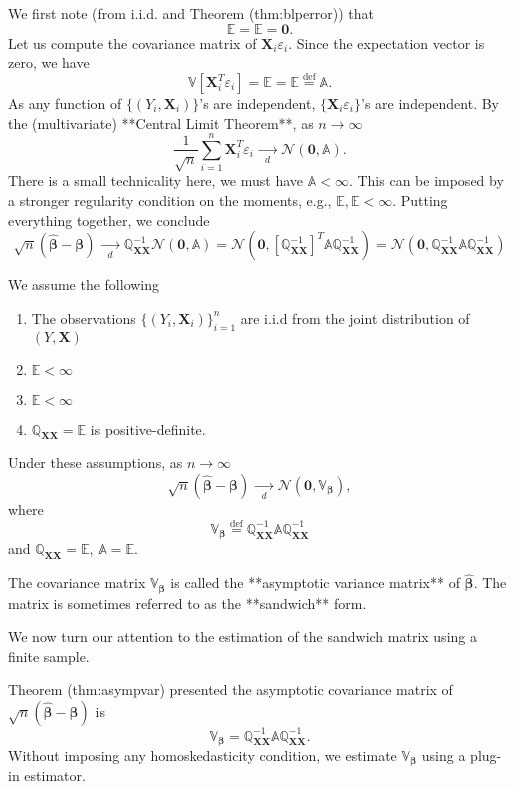 \documentclass[12pt, block=fill]{beamer}
\newcommand{\E}[1]{\mathbb{E}}
\renewcommand{\v}[1]{\boldsymbol{#1}}
\newcommand{\m}[1]{\mathbb{#1}}
\newcommand{\eps}{\varepsilon}
\begin{document}
We first note (from i.i.d. and Theorem \@ref(thm:blperror)) that 
$$
\E{\v{X}_i^T\eps_i}=\E{\v{X}^T\eps}=\v{0}.
$$
Let us compute the covariance matrix of $\v{X}_i\eps_i$. Since the expectation vector is zero, we have 
$$
\m{V}[\v{X}_i^T\eps_i]=\E{\v{X}_i^T\eps_i\left(\v{X}_i^T\eps_i\right)^T}=\E{\v{X}^T\v{X}\eps^2}\stackrel{\text{def}}{=}\m{A}.
$$
As any function of $\{(Y_i,\v{X}_i)\}$'s are independent,  $\{\v{X}_i\eps_i\}$'s are independent. By the (multivariate) **Central Limit Theorem**, as $n\to\infty$
$$
\frac{1}{\sqrt{n}}\sum\limits_{i=1}^n\v{X}_i^T\eps_i
\xrightarrow[d]{\quad\quad}\mathcal{N}(\v{0},\m{A}).
$$
There is a small technicality here, we must have $\m{A}<\infty$. This can be imposed by a stronger regularity condition on the moments, e.g.,
$\E{Y^4},\E{||\v{X}||^4}<\infty$.
Putting everything together, we conclude
$$
\sqrt{n}(\widehat{\v{\beta}}-\v{\beta})\xrightarrow[d]{\quad\quad}
\m{Q}_{\v{XX}}^{-1}\mathcal{N}(\v{0},\m{A})
=\mathcal{N}\left(\v{0},\left[\m{Q}_{\v{XX}}^{-1}\right]^T\m{A}\m{Q}_{\v{XX}}^{-1}\right)
=\mathcal{N}\left(\v{0},\m{Q}_{\v{XX}}^{-1}\m{A}\m{Q}_{\v{XX}}^{-1}\right)
$$

We assume the following
\begin{enumerate}
\item The observations $\{(Y_i,\v{X}_i)\}_{i=1}^n$ are i.i.d from the joint
distribution of $(Y,\v{X})$  
\item $\E{Y^4}<\infty$  
\item $\E{||\v{X}||^4}<\infty$  
\item $\m{Q}_{\v{XX}}=\E{\v{X}\v{X}'}$ is positive-definite.
\end{enumerate}
Under these assumptions, as $n\to\infty$
$$
\sqrt{n}(\widehat{\v{\beta}}-\v{\beta})\xrightarrow[d]{\quad\quad}
\mathcal{N}\left(\v{0},\m{V}_{\v{\beta}}\right),
$$
where 
$$\m{V}_{\v{\beta}}\stackrel{\text{def}}{=}\m{Q}_{\v{XX}}^{-1}\m{A}\m{Q}_{\v{XX}}^{-1}$$
and $\m{Q}_{\v{XX}}=\E{\v{X}^T\v{X}}$, $\m{A}=\E{\v{X}^T\v{X}\eps^2}$.



The covariance matrix $\m{V}_{\v{\beta}}$ is called the **asymptotic variance matrix** of $\widehat{\v{\beta}}$. The matrix is sometimes referred to as the **sandwich** form.

We now turn our attention to the estimation of the sandwich matrix using a finite sample.

Theorem \@ref(thm:asympvar) presented the asymptotic covariance matrix of
$\sqrt{n}(\widehat{\v{\beta}}-\v{\beta})$ is
$$\m{V}_{\v{\beta}}
=\m{Q}_{\v{XX}}^{-1}\m{A}\m{Q}_{\v{XX}}^{-1}.$$
Without imposing any homoskedasticity condition, we estimate $\m{V}_{\v{\beta}}$ using a plug-in estimator.
\end{document}
